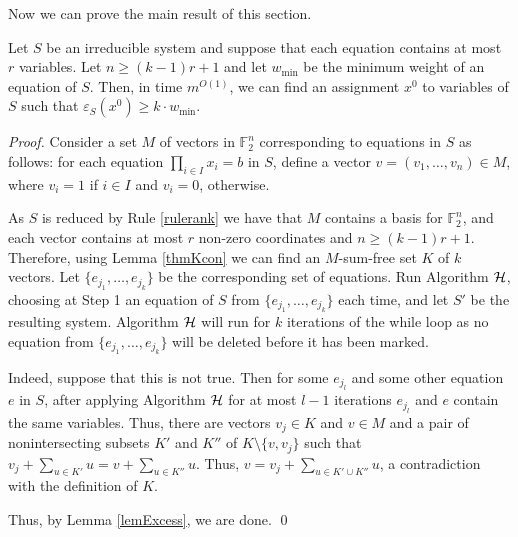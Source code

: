 \documentclass{llncs}
\begin{document}

Now we can prove the main result of this section.


\begin{theorem}\label{lemYes}
Let $S$ be an irreducible system and suppose that each equation contains at most $r$ variables. Let $n\ge (k-1)r+1$ and let $w_{\min}$ be the minimum weight of an equation of $S$. Then, in time $m^{O(1)}$, we can find an assignment $x^0$ to variables of $S$  such that $\varepsilon_S(x^0)\ge k\cdot w_{\min}.$
\end{theorem}
\begin{proof}
Consider a set $M$ of vectors in $\mathbb{F}_2^n$ corresponding to equations in $S$ as follows: for each equation $\prod_{i \in I} x_i =b$ in $S$, define a vector $v=(v_1,\ldots ,v_{n})\in M$, where $v_i=1$ if $i\in I$ and $v_i=0$, otherwise.

As $S$ is reduced by Rule \ref{rulerank} we have that $M$ contains a basis for $\mathbb{F}^n_2$, and each vector contains at most $r$ non-zero coordinates and $n\ge (k-1)r+1$. Therefore, using Lemma \ref{thmKcon} we can find an $M$-sum-free set $K$ of $k$ vectors. Let $\{e_{j_1}, \ldots, e_{j_k}\}$ be the corresponding set of equations. Run Algorithm $\cal H$, choosing at Step 1
an equation of $S$ from $\{e_{j_1}, \ldots, e_{j_k}\}$ each time,
and let $S'$ be the resulting system.
Algorithm $\cal H$ will run for $k$ iterations of the while loop as
no equation from $\{e_{j_1}, \ldots, e_{j_k}\}$ will be deleted before it has been marked.

Indeed, suppose that this is not true. Then for some $e_{j_l}$ and some other equation $e$ in $S$, after
applying Algorithm $\cal H$ for at most $l-1$ iterations $e_{j_l}$ and $e$ contain the same variables.
Thus, there are vectors $v_j\in K$ and $v\in M$ and a pair of nonintersecting subsets $K'$ and $K''$ of $K\setminus \{v,v_j\}$ such that $v_j+\sum_{u\in K'}u=v+\sum_{u\in K''}u$. Thus,
$v=v_j+\sum_{u\in K'\cup K''}u$, a contradiction with the definition of $K.$

Thus, by Lemma \ref{lemExcess}, we are done.
\qed \end{proof}
\end{document}
